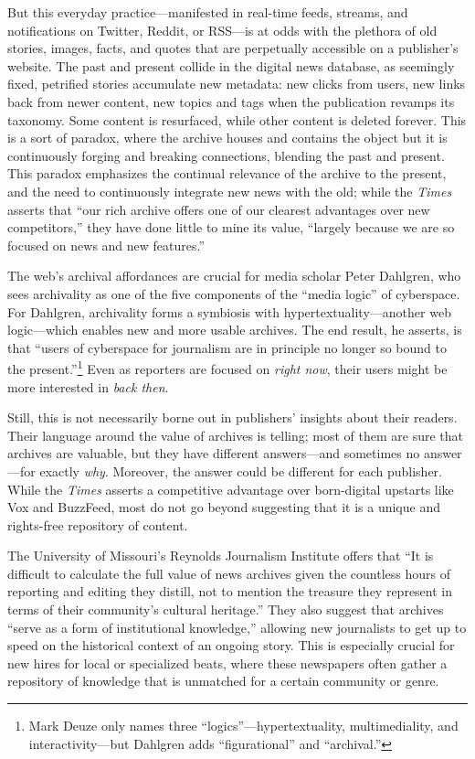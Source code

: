 
But this everyday practice---manifested in real-time feeds, streams, and notifications on Twitter, Reddit, or RSS---is at odds with the plethora of old stories, images, facts, and quotes that are perpetually accessible on a publisher's website. The past and present collide in the digital news database, as seemingly fixed, petrified stories accumulate new metadata: new clicks from users, new links back from newer content, new topics and tags when the publication revamps its taxonomy. Some content is resurfaced, while other content is deleted forever. This is a sort of paradox, where the archive houses and contains the object but it is continuously forging and breaking connections, blending the past and present. This paradox emphasizes the continual relevance of the archive to the present, and the need to continuously integrate new news with the old; while the \emph{Times} asserts that ``our rich archive offers one of our clearest advantages over new competitors,'' they have done little to mine its value, ``largely because we are so focused on news and new features.''\autocite[28]{_innovation_2014}

The web's archival affordances are crucial for media scholar Peter Dahlgren, who sees archivality as one of the five components of the ``media logic'' of cyberspace. For Dahlgren, archivality forms a symbiosis with hypertextuality---another web logic---which enables new and more usable archives. The end result, he asserts, is that ``users of cyberspace for journalism are in principle no longer so bound to the present.''\autocite[66]{dahlgren_media_1996}\footnote{Mark Deuze only names three ``logics''---hypertextuality, multimediality, and interactivity---but Dahlgren adds ``figurational'' and ``archival.''} Even as reporters are focused on \emph{right now}, their users might be more interested in \emph{back then}.

Still, this is not necessarily borne out in publishers' insights about their readers. Their language around the value of archives is telling; most of them are sure that archives are valuable, but they have different answers---and sometimes no answer---for exactly \emph{why}. Moreover, the answer could be different for each publisher. While the \emph{Times} asserts a competitive advantage over born-digital upstarts like Vox and BuzzFeed, most do not go beyond suggesting that it is a unique and rights-free repository of content.

The University of Missouri's Reynolds Journalism Institute offers that ``It is difficult to calculate the full value of news archives given the countless hours of reporting and editing they distill, not to mention the treasure they represent in terms of their community's cultural heritage.''\autocite{mccain_saving_2014} They also suggest that archives ``serve as a form of institutional knowledge,'' allowing new journalists to get up to speed on the historical context of an ongoing story. This is especially crucial for new hires for local or specialized beats, where these newspapers often gather a repository of knowledge that is unmatched for a certain community or genre.

